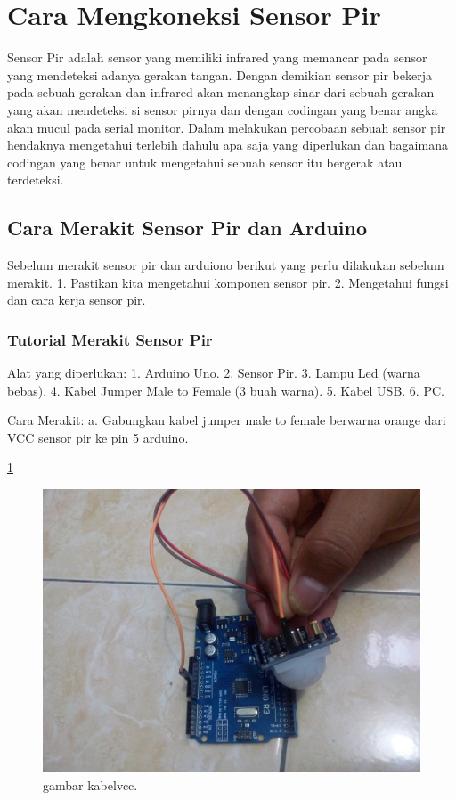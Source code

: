 
\section{Cara Mengkoneksi Sensor Pir}

Sensor Pir adalah sensor yang memiliki infrared yang memancar pada sensor yang mendeteksi adanya gerakan tangan.
Dengan demikian sensor pir bekerja pada sebuah gerakan dan infrared akan menangkap sinar dari sebuah gerakan yang akan mendeteksi si sensor pirnya dan dengan codingan yang benar angka akan mucul pada serial monitor.
Dalam melakukan percobaan sebuah sensor pir hendaknya mengetahui terlebih dahulu apa saja yang diperlukan dan bagaimana codingan yang benar untuk mengetahui sebuah sensor itu bergerak atau terdeteksi.

\subsection {Cara Merakit Sensor Pir dan Arduino}

Sebelum merakit sensor pir dan arduiono berikut yang perlu dilakukan sebelum merakit.
1. Pastikan kita mengetahui komponen sensor pir.
2. Mengetahui fungsi dan cara kerja sensor pir.

\subsubsection {Tutorial Merakit Sensor Pir}
Alat yang diperlukan:
1. Arduino Uno.
2. Sensor Pir.
3. Lampu Led (warna bebas).
4. Kabel Jumper Male to Female (3 buah warna).
5. Kabel USB.
6. PC.

Cara Merakit:
a. Gabungkan kabel jumper male to female berwarna orange dari VCC sensor pir ke pin 5 arduino.

\ref{kabelvcc}

\begin{figure} [ht]
\centerline{\includegraphics[width=1\textwidth]{figures/kabelvcc.JPG}}
\caption{gambar kabelvcc.}
\label{kabelvcc}
\end{figure}

